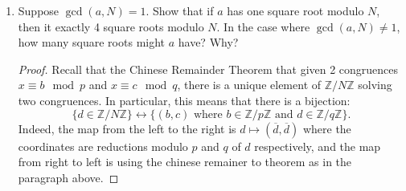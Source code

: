 \documentclass[11pt]{article}
\newcommand{\bZ}{\mathbb{Z}}
\begin{document}
\begin{enumerate}
{\begin{enumerate}
\begin{proof}
\begin{enumerate}[(1)]
        \item{Input $a,N$ and the factorization $N=pq$: An algorithm to determine if $a$ has a square root modulon $N$.}
        \item{If $a^{\frac{p-1}{2}}\not\equiv-1\mod p$ and $a^{\frac{q-1}{2}}\not\equiv-1\mod q$, return \verb|True|.}
        \item{Else return \verb|False|.}
      \end{enumerate}
    \end{proof}
    \item{
    Suppose $\gcd(a,N)=1$.  Show that if $a$ has one square root modulo $N$, then it exactly 4 square roots modulo $N$.  In the case where $\gcd(a,N)\not=1$, how many square roots might $a$ have? Why?
    }
    \begin{proof}
      Recall that the Chinese Remainder Theorem that given 2 congruences $x\equiv b\mod p$ and $x\equiv c\mod q$, there is a unique element of $\bZ/N\bZ$ solving two congruences.  In particular, this means that there is a bijection:
      \begin{equation}\label{prebij}
        \{d\in\bZ/N\bZ\}\leftrightarrow\{(b,c)\text{ where }b\in\bZ/p\bZ\text{ and }d\in\bZ/q\bZ\}.
      \end{equation}
      Indeed, the map from the left to the right is $d\mapsto(\overline d,\overline d)$ where the coordinates are reductions modulo $p$ and $q$ of $d$ respectively, and the map from right to left is using the chinese remainer to theorem as in the paragraph above.


\end{proof}
\end{enumerate}}
\end{enumerate}
\end{document}
